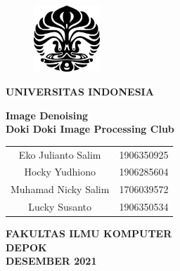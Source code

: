 \documentclass[11pt, a4paper, final]{report}
\begin{document}
\begin{titlepage}
    \begin{center}\begin{figure}
            \begin{center}
                \includegraphics[width=2.5cm]{makara.eps}
            \end{center}
        \end{figure}    
        \vspace*{0cm}
        \textbf{
        	UNIVERSITAS INDONESIA\\
        }
        
        \vspace*{1.0cm}
        \textbf{Image Denoising} \\[1.0cm]
        
        \vspace*{3 cm}
        \textbf{Doki Doki Image Processing Club} \\


\begin{table}[H]
        \centering
        \begin{tabular}{c c}
            Eko Julianto Salim & 1906350925\\
            Hocky Yudhiono & 1906285604 \\
            Muhamad Nicky Salim & 1706039572\\
            Lucky Susanto & 1906350534\\
        \end{tabular}
        \end{table}
        \vspace*{5.0cm}

        \textbf{
        	FAKULTAS ILMU KOMPUTER\\
        	DEPOK \\
        	DESEMBER 2021
        }
    \end{center}
\end{titlepage}

\onehalfspacing

\tableofcontents
{}  
\end{document}
